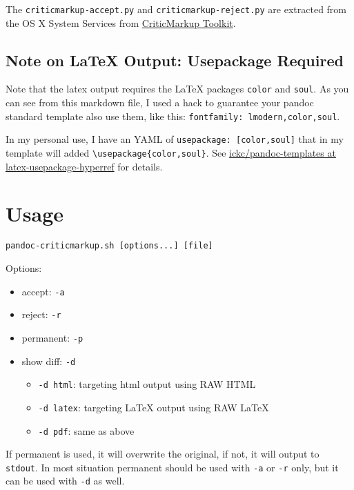 \documentclass[]{article}
\providecommand{\tightlist}{%
  \setlength{\itemsep}{0pt}\setlength{\parskip}{0pt}}
\begin{document}
The \texttt{criticmarkup-accept.py} and \texttt{criticmarkup-reject.py}
are extracted from the OS X System Services from
\href{http://criticmarkup.com/services.php}{CriticMarkup Toolkit}.

\subsection{Note on LaTeX Output: Usepackage
Required}\label{note-on-latex-output-usepackage-required}

Note that the latex output requires the LaTeX packages \texttt{color}
and \texttt{soul}. As you can see from this markdown file, I used a hack
to guarantee your pandoc standard template also use them, like this:
\texttt{fontfamily:\ lmodern,color,soul}.

In my personal use, I have an YAML of
\texttt{usepackage:\ {[}color,soul{]}} that in my template will added
\texttt{\textbackslash{}usepackage\{color,soul\}}. See
\href{https://github.com/ickc/pandoc-templates/tree/latex-usepackage-hyperref}{ickc/pandoc-templates
at latex-usepackage-hyperref} for details.

\section{Usage}\label{usage}

\texttt{pandoc-criticmarkup.sh\ {[}options...{]}\ {[}file{]}}

Options:

\begin{itemize}
\tightlist
\item
  accept: \texttt{-a}
\item
  reject: \texttt{-r}
\item
  permanent: \texttt{-p}
\item
  show diff: \texttt{-d}

  \begin{itemize}
  \tightlist
  \item
    \texttt{-d\ html}: targeting html output using RAW HTML
  \item
    \texttt{-d\ latex}: targeting LaTeX output using RAW LaTeX
  \item
    \texttt{-d\ pdf}: same as above
  \end{itemize}
\end{itemize}

If permanent is used, it will overwrite the original, if not, it will
output to \texttt{stdout}. In most situation permanent should be used
with \texttt{-a} or \texttt{-r} only, but it can be used with
\texttt{-d} as well.
\end{document}
